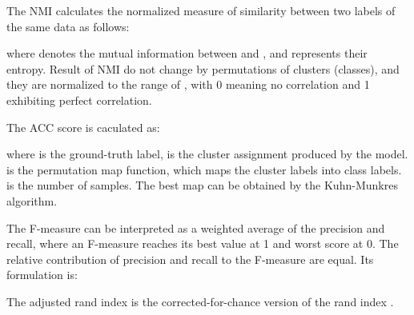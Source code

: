 \documentclass[journal]{IEEEtran}
\begin{document}
The NMI calculates the normalized measure of similarity between two labels of the same data as follows:

where  denotes the mutual information between  and , and  represents their entropy.
Result of NMI do not change by permutations of clusters (classes), and they are normalized to the range of , with 0 meaning no correlation and 1 exhibiting perfect correlation.

The ACC score is caculated as:

where  is the ground-truth label,  is the cluster assignment produced by the model.
 is the permutation map function, which maps the
cluster labels into class labels.
 is the number of samples.
The best map can be obtained by the Kuhn-Munkres algorithm.


The F-measure can be interpreted as a weighted average of the precision and recall, where an F-measure reaches its best value at 1 and worst score at 0.
The relative contribution of precision and recall to the F-measure are equal. Its formulation is:


The adjusted rand index is the corrected-for-chance version of the rand index \cite{rand1971objective}.
\end{document}
